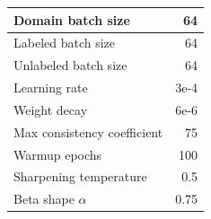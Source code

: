 \begin{tabular}{L{\WWW}  R{\RRR}}
\\ \hline
Domain batch size & 64
\\ \hline
Labeled batch size & 64
\\ \hline
Unlabeled batch size & 64
\\ \hline
Learning rate & 3e-4
\\ \hline
Weight decay & 6e-6
\\ \hline
Max consistency coefficient & 75
\\ \hline
Warmup epochs & 100
\\ \hline
Sharpening temperature & 0.5
\\ \hline
Beta shape $\alpha$ & 0.75
\end{tabular}